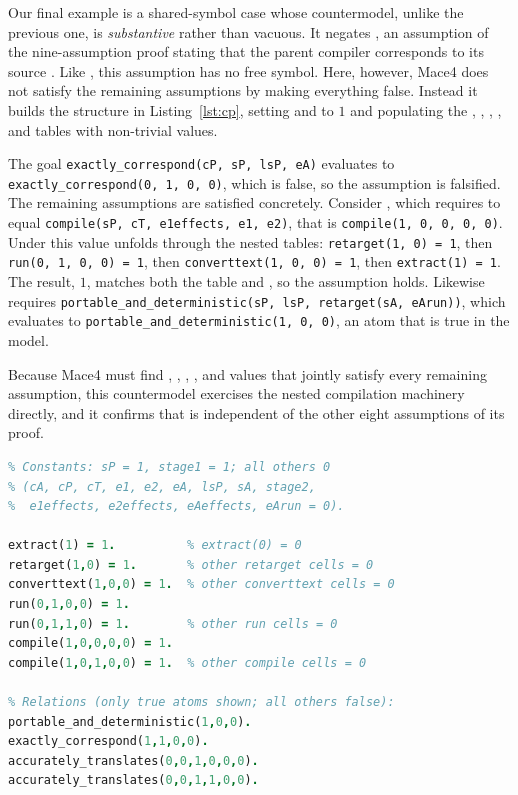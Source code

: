 Our final example is a shared-symbol case whose countermodel, unlike the previous one, is \emph{substantive} rather than vacuous. It negates , an assumption of the nine-assumption  proof stating that the parent compiler  corresponds to its source . Like , this assumption has no free symbol. Here, however, Mace4 does not satisfy the remaining assumptions by making everything false. Instead it builds the structure in Listing~\ref{lst:cp}, setting  and  to $1$ and populating the , , , , and  tables with non-trivial values.

The goal \texttt{exactly\_correspond(cP, sP, lsP, eA)} evaluates to \texttt{exactly\_correspond(0, 1, 0, 0)}, which is false, so the assumption is falsified. The remaining assumptions are satisfied concretely. Consider , which requires  to equal \texttt{compile(sP,\allowbreak{} cT,\allowbreak{} e1effects,\allowbreak{} e1,\allowbreak{} e2)}, that is \texttt{compile(1, 0, 0, 0, 0)}. Under  this value unfolds through the nested tables: \texttt{retarget(1, 0) = 1}, then \texttt{run(0, 1, 0, 0) = 1}, then \texttt{converttext(1, 0, 0) = 1}, then \texttt{extract(1) = 1}. The result, $1$, matches both the  table and , so the assumption holds. Likewise  requires \texttt{portable\_and\_deterministic(sP,\allowbreak{} lsP,\allowbreak{} retarget(sA, eArun))}, which evaluates to \texttt{portable\_and\_deterministic(1, 0, 0)}, an atom that is true in the model.

Because Mace4 must find , , , , and  values that jointly satisfy every remaining assumption, this countermodel exercises the nested compilation machinery directly, and it confirms that  is independent of the other eight assumptions of its proof.

\begin{lstlisting}[language=Prolog, float=tb, label=lst:cp, caption={Satisfying model for cP-corresponds-sP (all-repeats-independence-1).}]
% Interpretation of size 2 {0,1}
% Constants: sP = 1, stage1 = 1; all others 0
% (cA, cP, cT, e1, e2, eA, lsP, sA, stage2,
%  e1effects, e2effects, eAeffects, eArun = 0).

extract(1) = 1.          % extract(0) = 0
retarget(1,0) = 1.       % other retarget cells = 0
converttext(1,0,0) = 1.  % other converttext cells = 0
run(0,1,0,0) = 1.
run(0,1,1,0) = 1.        % other run cells = 0
compile(1,0,0,0,0) = 1.
compile(1,0,1,0,0) = 1.  % other compile cells = 0

% Relations (only true atoms shown; all others false):
portable_and_deterministic(1,0,0).
exactly_correspond(1,1,0,0).
accurately_translates(0,0,1,0,0,0).
accurately_translates(0,0,1,1,0,0).
\end{lstlisting}

